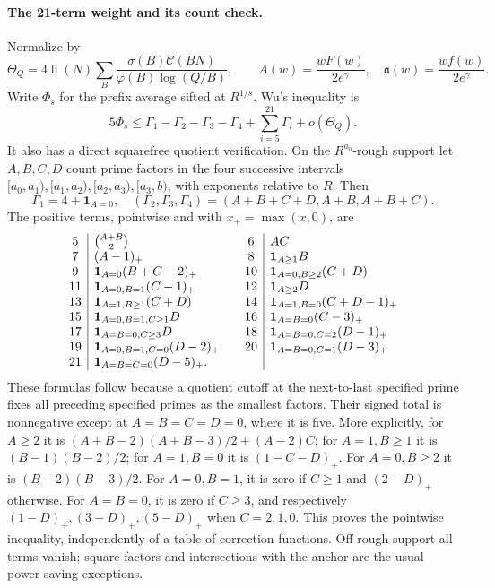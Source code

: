 \paragraph{The 21-term weight and its count check.}
Normalize by
\[
 \Theta_Q=4\operatorname{li}(N)
   \sum_B\frac{\sigma(B)\mathcal C(BN)}
                 {\varphi(B)\log(Q/B)},\qquad
 A(w)=\frac{wF(w)}{2e^\gamma},\quad
 \mathfrak a(w)=\frac{wf(w)}{2e^\gamma}.
\]
Write $\Phi_s$ for the prefix average sifted at $R^{1/s}$.
Wu's inequality is
\[
 5\Phi_s\le\Gamma_1-\Gamma_2-\Gamma_3-\Gamma_4
                       +\sum_{i=5}^{21}\Gamma_i+o(\Theta_Q).
\]
It also has a direct squarefree quotient verification.  On the
$R^{a_0}$-rough support let $A,B,C,D$ count prime factors in the
four successive intervals $[a_0,a_1),[a_1,a_2),[a_2,a_3),[a_3,b)$,
with exponents relative to $R$.  Then
\[
 \Gamma_1=4+\mathbf1_{A=0},\quad
 (\Gamma_2,\Gamma_3,\Gamma_4)=(A+B+C+D,A+B,A+B+C).
\]
The positive terms, pointwise and with $x_+=\max(x,0)$, are
\[
\begin{array}{c|l@{\qquad}c|l}
5&\binom{A+B}{2}&6&AC\\
7&(A-1)_+&8&\mathbf1_{A\ge1}B\\
9&\mathbf1_{A=0}(B+C-2)_+&10&\mathbf1_{A=0,B\ge2}(C+D)\\
11&\mathbf1_{A=0,B=1}(C-1)_+&12&\mathbf1_{A\ge2}D\\
13&\mathbf1_{A=1,B\ge1}(C+D)&14&\mathbf1_{A=1,B=0}(C+D-1)_+\\
15&\mathbf1_{A=0,B=1,C\ge1}D&16&\mathbf1_{A=B=0}(C-3)_+\\
17&\mathbf1_{A=B=0,C\ge3}D&18&\mathbf1_{A=B=0,C=2}(D-1)_+\\
19&\mathbf1_{A=0,B=1,C=0}(D-2)_+&20&\mathbf1_{A=B=0,C=1}(D-3)_+\\
21&\mathbf1_{A=B=C=0}(D-5)_+.&&
\end{array}
\]
These formulas follow because a quotient cutoff at the next-to-last
specified prime fixes all preceding specified primes as the smallest
factors.  Their signed total is nonnegative except at $A=B=C=D=0$,
where it is five.  More explicitly, for $A\ge2$ it is
$(A+B-2)(A+B-3)/2+(A-2)C$; for $A=1,B\ge1$ it is
$(B-1)(B-2)/2$; for $A=1,B=0$ it is $(1-C-D)_+$.
For $A=0,B\ge2$ it is $(B-2)(B-3)/2$.
For $A=0,B=1$, it is zero if $C\ge1$ and $(2-D)_+$ otherwise.
For $A=B=0$, it is zero if $C\ge3$, and respectively
$(1-D)_+,(3-D)_+,(5-D)_+$ when $C=2,1,0$.
This proves the pointwise inequality, independently of a table of
correction functions.  Off rough support all terms vanish; square
factors and intersections with the anchor are the usual power-saving
exceptions.

